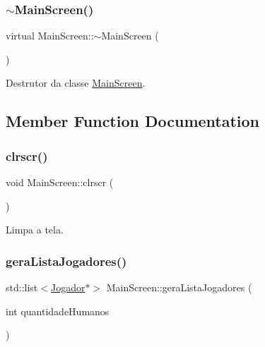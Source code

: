 \subsubsection{\texorpdfstring{$\sim$MainScreen()}{~MainScreen()}}
{\footnotesize\ttfamily virtual Main\+Screen\+::$\sim$\+Main\+Screen (\begin{DoxyParamCaption}{ }\end{DoxyParamCaption})\hspace{0.3cm}{\ttfamily [virtual]}}



Destrutor da classe \mbox{\hyperlink{class_main_screen}{Main\+Screen}}. 



\subsection{Member Function Documentation}
\mbox{\label{class_main_screen_ac3fa0644a44436d74b96c68064edbcb4}} 
\subsubsection{\texorpdfstring{clrscr()}{clrscr()}}
{\footnotesize\ttfamily void Main\+Screen\+::clrscr (\begin{DoxyParamCaption}{ }\end{DoxyParamCaption})\hspace{0.3cm}{\ttfamily [protected]}}



Limpa a tela. 

\mbox{\label{class_main_screen_a03afd01f1c0be9b08757f33c8d324ac2}} 
\subsubsection{\texorpdfstring{geraListaJogadores()}{geraListaJogadores()}}
{\footnotesize\ttfamily std\+::list$<$\mbox{\hyperlink{class_jogador}{Jogador}}$\ast$$>$ Main\+Screen\+::gera\+Lista\+Jogadores (\begin{DoxyParamCaption}\item[{int}]{quantidade\+Humanos }\end{DoxyParamCaption})}




